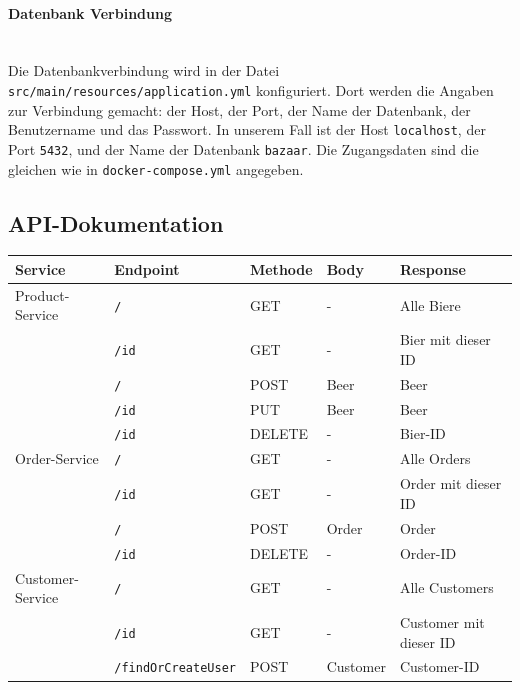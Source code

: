 \paragraph{Datenbank Verbindung} \mbox{} \\
Die Datenbankverbindung wird in der Datei \texttt{src/main/resources/application.yml} konfiguriert. Dort werden die Angaben zur Verbindung gemacht: der Host, der Port, der Name der Datenbank, der Benutzername und das Passwort. In unserem Fall ist der Host \texttt{localhost}, der Port \texttt{5432}, und der Name der Datenbank \texttt{bazaar}. Die Zugangsdaten sind die gleichen wie in \texttt{docker-compose.yml} angegeben.

\subsection{API-Dokumentation}
\label{subsec:api-dokumentation}

\begin{tabular}{|l|l|l|l|l|}
\hline
\textbf{Service}    & \textbf{Endpoint}          & \textbf{Methode } & \textbf{Body} & \textbf{Response}       \\ \hline
Product-Service     & \texttt{/}                 & GET               & -             & Alle Biere              \\ \hline
                    & \texttt{/{id}}             & GET               & -             & Bier mit dieser ID      \\ \hline
                    & \texttt{/}                 & POST              & Beer          & Beer                    \\ \hline
                    & \texttt{/{id}}             & PUT               & Beer          & Beer                    \\ \hline
                    & \texttt{/{id}}             & DELETE            & -             & Bier-ID                 \\ \hline
Order-Service       & \texttt{/}                 & GET               & -             & Alle Orders             \\ \hline
                    & \texttt{/{id}}             & GET               & -             & Order mit dieser ID     \\ \hline
                    & \texttt{/}                 & POST              & Order         & Order                   \\ \hline
                    & \texttt{/{id}}             & DELETE            & -             & Order-ID                \\ \hline
Customer-Service    & \texttt{/}                 & GET               & -             & Alle Customers          \\ \hline
                    & \texttt{/{id}}             & GET               & -             & Customer mit dieser ID  \\ \hline
                    & \texttt{/findOrCreateUser} & POST              & Customer      & Customer-ID             \\ \hline
\end{tabular}